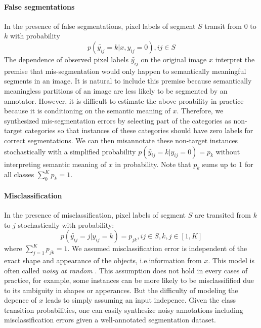 

\paragraph{False segmentations}

In the presence of false segmentations, pixel labels of segment $S$ transit from $0$ to $k$ with probability
$$p(\tilde{y_{ij}}=k \vert x, y_{ij}=0), ij \in S $$
The dependence of observed pixel labels $\tilde{y_{ij}}$ on the original image $x$ interpret the premise that mis-segmentation would only happen to semantically meaningful segments in an image.
It is natural to include this premise because semantically meaningless partitions of an image are less likely to be segmented by an annotator.
However, it is difficult to estimate the above proability in practice because it is conditioning on the semantic meaning of $x$.
Therefore, we synthesized mis-segmentation errors by selecting part of the categories as non-target categories so that instances of these categories should have zero labels for correct segmentations.
We can then misannotate these non-target instances stochastically with a simplified probability $p(\tilde{y_{ij}}=k \vert y_{ij}=0)=p_k$ without  interpreting semantic meaning of $x$ in probability.
Note that $p_k$ sums up to 1 for all classes $\sum_0^K p_k = 1$.

\paragraph{Misclassification}

In the presence of misclassification, pixel labels of segment $S$ are transited from $k$ to $j$ stochastically with probability:
$$p(\tilde{y_{ij}}=j \vert y_{ij}=k) = p_{jk}, ij \in S, k,j \in [1,K]$$
where $\sum_{j=1}^{K}p_{jk}=1$.
We assumed misclassification error is independent of the exact shape and appearance of the objects, i.e.information from $x$.
This model is often called \textit{noisy at random} \cite{frenay2014classification}.
This assumption does not hold in every cases of practice, for example, some instances can be more likely to be misclassifified due to its ambiguity in shapes or apperances.
But the difficulty of modeling the depence of $x$ leads to simply assuming an input indepence.
Given the class transition probabilities, one can easily synthesize noisy annotations including misclassification errors given a well-annotated segmentation dataset.

